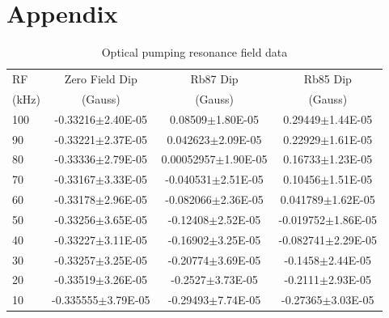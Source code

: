 \documentclass[prb,preprint]{revtex4-1}
\begin{document}
\section{Appendix}
\begin{table}[h]
\centering
\caption{Optical pumping resonance field data}
\begin{ruledtabular}
\begin{tabular}{ l c c c}
RF & Zero Field Dip & Rb87 Dip & Rb85 Dip\\
(kHz) & (Gauss) & (Gauss) & (Gauss)\\
\hline
100	& -0.33216$\pm$2.40E-05 & 0.08509$\pm$1.80E-05 & 0.29449$\pm$1.44E-05\\
90&-0.33221$\pm$2.37E-05&0.042623$\pm$2.09E-05&0.22929$\pm$1.61E-05\\
80&-0.33336$\pm$2.79E-05&0.00052957$\pm$1.90E-05&0.16733$\pm$1.23E-05\\
70&-0.33167$\pm$3.33E-05&-0.040531$\pm$2.51E-05&0.10456$\pm$1.51E-05\\
60&-0.33178$\pm$2.96E-05&-0.082066$\pm$2.36E-05&0.041789$\pm$1.62E-05\\
50&-0.33256$\pm$3.65E-05&-0.12408$\pm$2.52E-05&-0.019752$\pm$1.86E-05\\
40&-0.33227$\pm$3.11E-05&-0.16902$\pm$3.25E-05&-0.082741$\pm$2.29E-05\\
30&-0.33257$\pm$3.25E-05&-0.20774$\pm$3.69E-05&-0.1458$\pm$2.44E-05	\\
20&-0.33519$\pm$3.26E-05&-0.2527$\pm$3.73E-05&-0.2111$\pm$2.93E-05\\
10	&-0.335555$\pm$3.79E-05&-0.29493$\pm$7.74E-05&-0.27365$\pm$3.03E-05\\
\end{tabular}
\end{ruledtabular}
\label{data}
\end{table}
\end{document}

